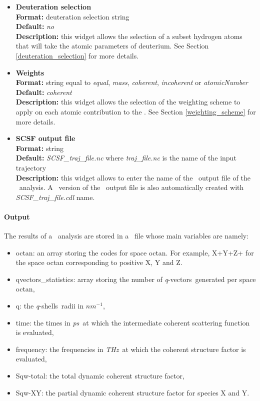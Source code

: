 \documentclass[a4paper,11pt]{report}
\newcommand{\ps}{\textit{ps}}
\newcommand{\invnm}{$nm^{-1}$}
\newcommand{\thz}{\textit{THz}}
\newcommand{\qvects}{\textit{q}-vectors}
\newcommand{\qshells}{\textit{q}-shells}
\begin{document}
\begin{itemize}
\hypertarget{scsf_deuteration_selection}{}
\item \textbf{Deuteration selection}\\
\textbf{Format:} deuteration selection string\\
\textbf{Default:} \textit{no}\\
\textbf{Description:} this widget allows the selection of a subset hydrogen atoms that will take the atomic parameters 
of deuterium. See Section \ref{deuteration_selection} for more details.

\hypertarget{scsf_weights}{}
\item \textbf{Weights}\\
\textbf{Format:} string equal to \textit{equal}, \textit{mass}, \textit{coherent}, \textit{incoherent} or \textit{atomicNumber}\\
\textbf{Default:} \textit{coherent}\\
\textbf{Description:} this widget allows the selection of the weighting scheme to apply on each atomic contribution 
to the \SCSF . See Section \ref{weighting_scheme} for more details. 

\hypertarget{scsf_scsf_output_file}{}
\item \textbf{SCSF output file}\\
\textbf{Format:} string\\
\textbf{Default:} \textit{SCSF\_traj\_file.nc} where \textit{traj\_file.nc} is the name of the input trajectory\\
\textbf{Description:} this widget allows to enter the name of the \NetCDF\ output file of the \SCSF\ analysis. A \CDL\ 
version of the \NetCDF\ output file is also automatically created with \textit{SCSF\_traj\_file.cdl} name.
\end{itemize}

\paragraph{Output\\}
The results of a \SCSF\ analysis are stored in a \NetCDF\ file whose main variables are namely:
\begin{itemize}
\item octan: an array storing the codes for space octan. For example, X+Y+Z+ for the space octan corresponding to positive
X, Y and Z.
\item qvectors\_statistics: array storing the number of \qvects\ generated per space octan,
\item q: the \qshells\ radii in \invnm ,
\item time: the times in \ps\ at which the intermediate coherent scattering function is evaluated,
\item frequency: the frequencies in \thz\ at which the coherent structure factor is evaluated,
\item Sqw-total: the total dynamic coherent structure factor,
\item Sqw-XY: the partial dynamic coherent structure factor for species X and Y.
\end{itemize}
\end{document}
